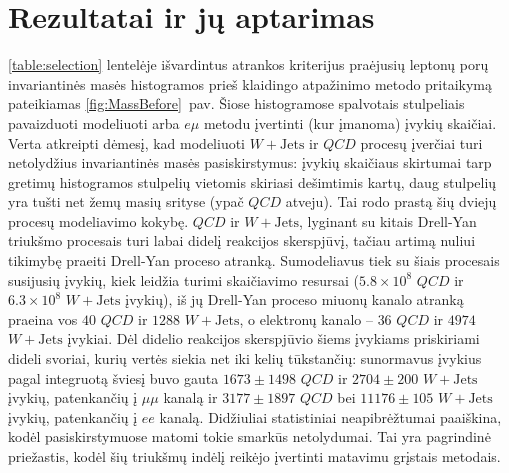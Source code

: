 \documentclass[a4paper, 12pt, oneside]{article}
\newcommand{\emu}{e\mu}
\newcommand{\WJets}{W\! +\!\mathrm{Jets}}
\newcommand{\QCD}{QC\! D}
\begin{document}
\section{Rezultatai ir jų aptarimas}
\ref{table:selection} lentelėje išvardintus atrankos kriterijus praėjusių leptonų porų invariantinės masės histogramos
prieš klaidingo atpažinimo metodo pritaikymą pateikiamas \ref{fig:MassBefore}~pav.
Šiose histogramose spalvotais stulpeliais pavaizduoti modeliuoti arba $\emu$ metodu įvertinti (kur įmanoma) įvykių skaičiai.
Verta atkreipti dėmesį, kad modeliuoti $\WJets$ ir $\QCD$ procesų įverčiai turi netolydžius invariantinės masės pasiskirstymus:
įvykių skaičiaus skirtumai tarp gretimų histogramos stulpelių vietomis skiriasi dešimtimis kartų, daug stulpelių yra tušti
net žemų masių srityse (ypač $\QCD$ atveju).
Tai rodo prastą šių dviejų procesų modeliavimo kokybę.
$\QCD$ ir $\WJets$, lyginant su kitais Drell-Yan triukšmo procesais turi labai didelį reakcijos skerspjūvį, tačiau artimą
nuliui tikimybę praeiti Drell-Yan proceso atranką.
Sumodeliavus tiek su šiais procesais susijusių įvykių, kiek leidžia turimi skaičiavimo resursai ($5.8\!\times\!10^8$ $\QCD$ ir
$6.3\!\times\!10^8$ $\WJets$ įvykių), iš jų Drell-Yan proceso miuonų kanalo atranką praeina vos $40$ $\QCD$ ir $1288$ $\WJets$,
o elektronų kanalo -- $36$ $\QCD$ ir $4974$ $\WJets$ įvykiai.
Dėl didelio reakcijos skerspjūvio šiems įvykiams priskiriami dideli svoriai, kurių vertės siekia net iki kelių tūkstančių:
sunormavus įvykius pagal integruotą šviesį buvo gauta $1673\pm1498$ $\QCD$ ir $2704\pm200$ $\WJets$ įvykių, patenkančių į
$\mu\mu$ kanalą ir $3177\pm1897$ $\QCD$ bei $11176\pm105$ $\WJets$ įvykių, patenkančių į $ee$ kanalą. 
Didžiuliai statistiniai neapibrėžtumai paaiškina, kodėl pasiskirstymuose matomi tokie smarkūs netolydumai.
Tai yra pagrindinė priežastis, kodėl šių triukšmų indėlį reikėjo įvertinti matavimu grįstais metodais.
\end{document}

